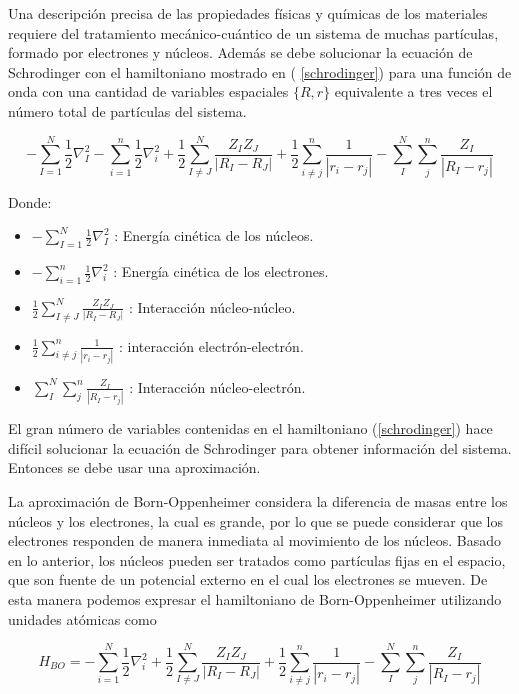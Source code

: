 Una descripci\'on precisa de las propiedades f\'isicas y qu\'imicas de los 
materiales requiere del tratamiento mec\'anico-cu\'antico de un sistema de 
muchas part\'iculas, formado por electrones y n\'ucleos. Adem\'as se debe 
solucionar la ecuaci\'on de Schrodinger con el hamiltoniano mostrado en ( 
\ref{schrodinger}) para una funci\'on de onda con una cantidad de 
variables espaciales $\{R,r\}$ equivalente a tres veces el n\'umero total de 
part\'iculas del sistema.

\begin{equation} \label{schrodinger}
-\sum _{I=1}^{N} \frac{1}{2} \nabla _{I}^{2} - \sum 
_{i=1}^{n} \frac{1}{2} \nabla _{i}^{2} + \frac{1}{2} \sum _{I \ne 
J}^{N} \frac{Z_{I}Z_{J}}{|R_{I}-R_{J}|} + \frac{1}{2} \sum _{i\ne j}^{n} 
\frac{1}{|r_{i}-r_{j}|} - \sum _{I}^{N} \sum _{j}^{n} 
\frac{Z_{I}}{|R_{I}-r_{j}|}
\end{equation}

Donde:

\begin{itemize}
    \item $\displaystyle -\sum _{I=1}^{N} \frac{1}{2} \nabla _{I}^{2}$ : 
    Energ\'ia cin\'etica de los n\'ucleos.
    \item $\displaystyle - \sum _{i=1}^{n} \frac{1}{2} \nabla _{i}^{2}$ : 
    Energ\'ia cin\'etica de los electrones.
    \item $\displaystyle \frac{1}{2} \sum _{I \ne J}^{N} 
    \frac{Z_{I}Z_{J}}{|R_{I}-R_{J}|}$ : 
    Interacci\'on n\'ucleo-n\'ucleo.
    \item $\displaystyle \frac{1}{2} \sum _{i\ne j}^{n} 
    \frac{1}{|r_{i}-r_{j}|}$ : 
    interacci\'on electr\'on-electr\'on.
    \item $\displaystyle \sum _{I}^{N} \sum _{j}^{n} 
    \frac{Z_{I}}{|R_{I}-r_{j}|}$ : 
    Interacci\'on n\'ucleo-electr\'on.
\end{itemize}

\noindent El gran n\'umero de variables contenidas en el hamiltoniano 
(\ref{schrodinger}) 
hace dif\'icil solucionar la ecuaci\'on de Schrodinger para obtener 
informaci\'on del sistema. Entonces se debe usar una aproximaci\'on.

\noindent La aproximaci\'on de Born-Oppenheimer considera la diferencia de 
masas entre 
los n\'ucleos y los electrones, la cual es grande, por lo que se puede 
considerar que los electrones responden de manera inmediata al movimiento de 
los n\'ucleos. Basado en lo anterior, los n\'ucleos pueden ser tratados como 
part\'iculas fijas en el espacio, que son fuente de un potencial externo en el 
cual los electrones se mueven. De esta manera podemos expresar el hamiltoniano 
de Born-Oppenheimer utilizando unidades at\'omicas como

\begin{equation}
H_{BO} =-\sum _{i=1}^{N} \frac{1}{2} \nabla _{i}^{2} + \frac{1}{2} \sum _{I \ne 
    J}^{N} \frac{Z_{I}Z_{J}}{|R_{I}-R_{J}|} + \frac{1}{2} \sum _{i\ne j}^{n} 
\frac{1}{|r_{i}-r_{j}|} - \sum _{I}^{N} \sum _{j}^{n} 
\frac{Z_{I}}{|R_{I}-r_{j}|}
\label{born-oppenheimer}
\end{equation}
